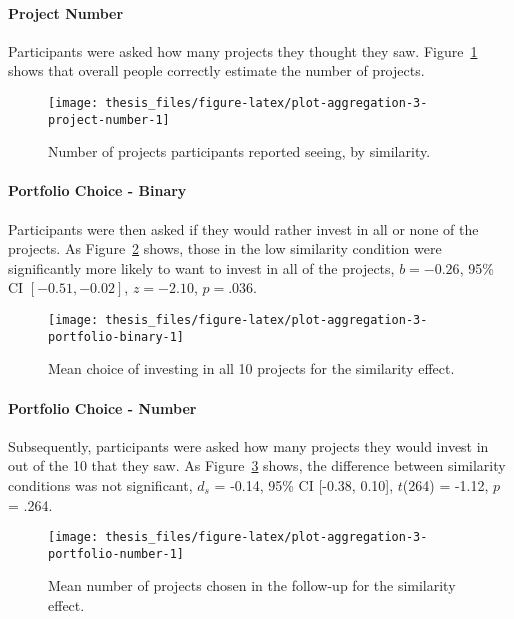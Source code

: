 \documentclass[a4paper, nobind]{templates/ociamthesis}
\theoremstyle{definition}
\theoremstyle{definition}
\theoremstyle{definition}
\theoremstyle{definition}
\theoremstyle{remark}
\begin{document}
\paragraph{Project Number}

Participants were asked how many projects they thought they saw.
Figure~\ref{fig:plot-aggregation-3-project-number} shows that overall people
correctly estimate the number of projects.



\begin{figure}
\texttt{[image: thesis\_files/figure-latex/plot-aggregation-3-project-number-1]} \caption{Number of projects participants reported seeing, by similarity.}\label{fig:plot-aggregation-3-project-number}
\end{figure}

\paragraph{Portfolio Choice - Binary}

Participants were then asked if they would rather invest in all or none of the
projects. As Figure~\ref{fig:plot-aggregation-3-portfolio-binary} shows, those
in the low similarity condition were significantly more likely to want to invest
in all of the projects,
\(b = -0.26\), 95\% CI \([-0.51, -0.02]\), \(z = -2.10\), \(p = .036\).



\begin{figure}
\texttt{[image: thesis\_files/figure-latex/plot-aggregation-3-portfolio-binary-1]} \caption{Mean choice of investing in all 10 projects for the similarity effect.}\label{fig:plot-aggregation-3-portfolio-binary}
\end{figure}

\paragraph{Portfolio Choice - Number}

Subsequently, participants were asked how many projects they would invest in out
of the 10 that they saw. As
Figure~\ref{fig:plot-aggregation-3-portfolio-number} shows, the difference
between similarity conditions was not significant,
\(d_s\) = -0.14, 95\% CI {[}-0.38, 0.10{]}, \(t\)(264) = -1.12, \(p\) = .264.



\begin{figure}
\texttt{[image: thesis\_files/figure-latex/plot-aggregation-3-portfolio-number-1]} \caption{Mean number of projects chosen in the follow-up for the similarity effect.}\label{fig:plot-aggregation-3-portfolio-number}
\end{figure}
\end{document}
